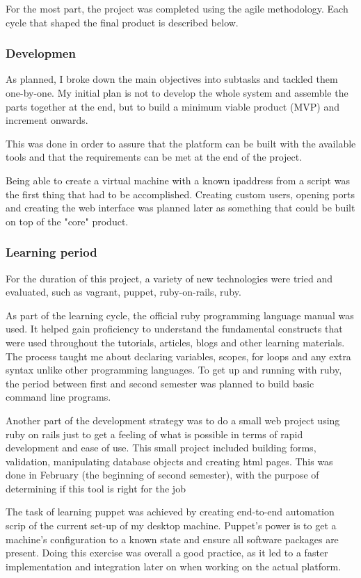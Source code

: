 \documentclass{article}
\begin{document}
For the most part, the project was completed using the agile methodology. Each cycle that shaped the final product is described below.
\subsubsection{Developmen}
As planned, I broke down the main objectives into subtasks and tackled them one-by-one. My initial plan is not to develop the whole system and assemble the parts together at the end, but to build a minimum viable product (MVP) and increment onwards.

This was done in order to assure that the platform can be built with the available tools and that the requirements can be met at the end of the project.

Being able to create a virtual machine with a known \gls{ipaddress} from a script was the first thing that had to be accomplished. Creating custom users, opening ports and creating the web interface was planned later as something that could be built on top of the "core" product.

\subsubsection{Learning period}
For the duration of this project, a variety of new technologies were tried and evaluated, such as \gls{vagrant}, \gls{puppet}, \gls{ruby-on-rails}, \gls{ruby}.

As part of the learning cycle, the official ruby programming language manual was used. It helped gain proficiency to understand the fundamental constructs that were used throughout the tutorials, articles, blogs and other learning materials. The process taught me about declaring variables, scopes, for loops and any extra syntax unlike other programming languages. To get up and running with \gls{ruby}, the period between first and second semester was planned to build basic command line programs.

Another part of the development strategy was to do a small web project using ruby on rails just to get a feeling of what is possible in terms of rapid development and ease of use. This small project included building forms, validation, manipulating database objects and creating \gls{html} pages. This was done in February (the beginning of second semester), with the purpose of determining if this tool is right for the job

The task of learning \gls{puppet} was achieved by creating end-to-end automation scrip of the current set-up of my desktop machine. Puppet's power is to get a machine's configuration to a known state and ensure all software packages are present. Doing this exercise was overall a good practice, as it led to a faster implementation and integration later on when working on the actual platform.
\end{document}
